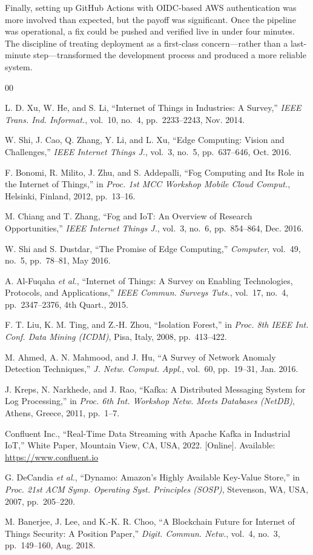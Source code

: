 \documentclass[conference]{IEEEtran}
\begin{document}
Finally, setting up GitHub Actions with OIDC-based AWS authentication was
more involved than expected, but the payoff was significant. Once the pipeline
was operational, a fix could be pushed and verified live in under four minutes.
The discipline of treating deployment as a first-class concern---rather than
a last-minute step---transformed the development process and produced a more
reliable system.

\begin{thebibliography}{00}

L. D. Xu, W. He, and S. Li, ``Internet of Things in Industries: A Survey,''
\textit{IEEE Trans. Ind. Informat.}, vol.~10, no.~4, pp.~2233--2243,
Nov. 2014.

W. Shi, J. Cao, Q. Zhang, Y. Li, and L. Xu, ``Edge Computing: Vision and
Challenges,'' \textit{IEEE Internet Things J.}, vol.~3, no.~5,
pp.~637--646, Oct. 2016.

F. Bonomi, R. Milito, J. Zhu, and S. Addepalli, ``Fog Computing and Its
Role in the Internet of Things,'' in \textit{Proc. 1st MCC Workshop Mobile
Cloud Comput.}, Helsinki, Finland, 2012, pp.~13--16.

M. Chiang and T. Zhang, ``Fog and IoT: An Overview of Research
Opportunities,'' \textit{IEEE Internet Things J.}, vol.~3, no.~6,
pp.~854--864, Dec. 2016.

W. Shi and S. Dustdar, ``The Promise of Edge Computing,''
\textit{Computer}, vol.~49, no.~5, pp.~78--81, May 2016.

A. Al-Fuqaha \textit{et al.}, ``Internet of Things: A Survey on Enabling
Technologies, Protocols, and Applications,'' \textit{IEEE Commun. Surveys
Tuts.}, vol.~17, no.~4, pp.~2347--2376, 4th Quart., 2015.

F. T. Liu, K. M. Ting, and Z.-H. Zhou, ``Isolation Forest,'' in
\textit{Proc. 8th IEEE Int. Conf. Data Mining (ICDM)}, Pisa, Italy,
2008, pp.~413--422.

M. Ahmed, A. N. Mahmood, and J. Hu, ``A Survey of Network Anomaly
Detection Techniques,'' \textit{J. Netw. Comput. Appl.}, vol.~60,
pp.~19--31, Jan. 2016.

J. Kreps, N. Narkhede, and J. Rao, ``Kafka: A Distributed Messaging
System for Log Processing,'' in \textit{Proc. 6th Int. Workshop Netw.
Meets Databases (NetDB)}, Athens, Greece, 2011, pp.~1--7.

Confluent Inc., ``Real-Time Data Streaming with Apache Kafka in Industrial
IoT,'' White Paper, Mountain View, CA, USA, 2022. [Online]. Available:
\url{https://www.confluent.io}

G. DeCandia \textit{et al.}, ``Dynamo: Amazon's Highly Available
Key-Value Store,'' in \textit{Proc. 21st ACM Symp. Operating Syst.
Principles (SOSP)}, Stevenson, WA, USA, 2007, pp.~205--220.

M. Banerjee, J. Lee, and K.-K. R. Choo, ``A Blockchain Future for
Internet of Things Security: A Position Paper,'' \textit{Digit. Commun.
Netw.}, vol.~4, no.~3, pp.~149--160, Aug. 2018.

\end{thebibliography}
\end{document}
